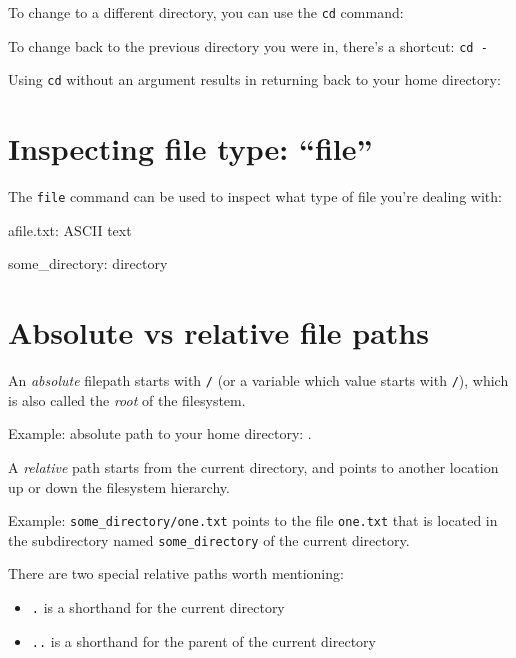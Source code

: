 To change to a different directory, you can use the \lstinline|cd| command:

\begin{prompt}
\end{prompt}

To change back to the previous directory you were in, there's a shortcut: \lstinline|cd -|

Using \lstinline|cd| without an argument results in returning back to your home directory:

\begin{prompt}
\end{prompt}

\section{Inspecting file type: ``file''}

The \lstinline|file| command can be used to inspect what type of file you're dealing with:

\begin{prompt}
afile.txt: ASCII text

some_directory: directory
\end{prompt}

\section{Absolute vs relative file paths}

An \emph{absolute} filepath starts with \lstinline|/| (or a variable which value starts
with  \lstinline|/|), which is also called the \emph{root} of the filesystem.

Example: absolute path to your home directory:
\texttt{\homedir}.

A \emph{relative} path starts from the current directory, and points to another
location up or down the filesystem hierarchy.

Example: \lstinline|some_directory/one.txt| points to the file \lstinline|one.txt| that is
located in the subdirectory named \lstinline|some_directory| of the current directory.

There are two special relative paths worth mentioning:

\begin{itemize}
    \item \lstinline|.| is a shorthand for the current directory
    \item \lstinline|..| is a shorthand for the parent of the current directory
\end{itemize}

